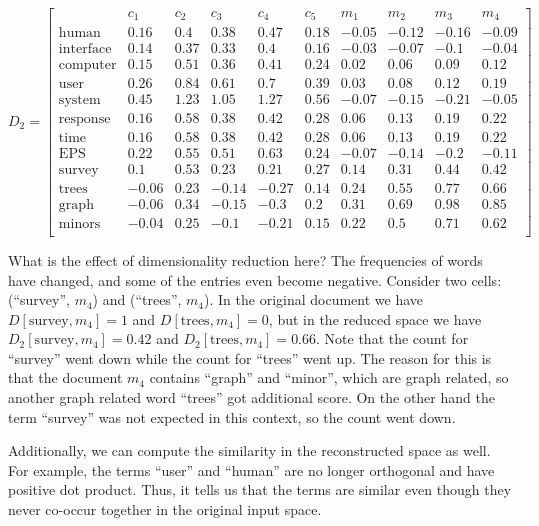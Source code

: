 $$D_2 =
\left[\begin{array}{c|ccccccccc}
 & c_1 & c_2 & c_3 & c_4 & c_5 & m_1 & m_2 & m_3 & m_4 \\
\hline
\text{human} & 0.16 & 0.4 & 0.38 & 0.47 & 0.18 & -0.05 & -0.12 & -0.16 & -0.09 \\
\text{interface} & 0.14 & 0.37 & 0.33 & 0.4 & 0.16 & -0.03 & -0.07 & -0.1 & -0.04 \\
\text{computer} & 0.15 & 0.51 & 0.36 & 0.41 & 0.24 & 0.02 & 0.06 & 0.09 & 0.12 \\
\text{user} & 0.26 & 0.84 & 0.61 & 0.7 & 0.39 & 0.03 & 0.08 & 0.12 & 0.19 \\
\text{system} & 0.45 & 1.23 & 1.05 & 1.27 & 0.56 & -0.07 & -0.15 & -0.21 & -0.05 \\
\text{response} & 0.16 & 0.58 & 0.38 & 0.42 & 0.28 & 0.06 & 0.13 & 0.19 & 0.22 \\
\text{time} & 0.16 & 0.58 & 0.38 & 0.42 & 0.28 & 0.06 & 0.13 & 0.19 & 0.22 \\
\text{EPS} & 0.22 & 0.55 & 0.51 & 0.63 & 0.24 & -0.07 & -0.14 & -0.2 & -0.11 \\
\text{survey} & 0.1 & 0.53 & 0.23 & 0.21 & 0.27 & 0.14 & 0.31 & 0.44 & 0.42 \\
\text{trees} &-0.06 & 0.23 & -0.14 & -0.27 & 0.14 & 0.24 & 0.55 & 0.77 & 0.66 \\
\text{graph} &-0.06 & 0.34 & -0.15 & -0.3 & 0.2 & 0.31 & 0.69 & 0.98 & 0.85 \\
\text{minors} &-0.04 & 0.25 & -0.1 & -0.21 & 0.15 & 0.22 & 0.5 & 0.71 & 0.62 \\
\end{array}\right]$$


What is the effect of dimensionality reduction here? The frequencies of
words have changed, and some of the entries even become negative. 
Consider two cells: (``survey'', $m_4$) and (``trees'', $m_4$). 
In the original document we have 
$D[\text{survey}, m_4] = 1$ and $D[\text{trees}, m_4] = 0$, but in the reduced space we have 
$D_2 [\text{survey}, m_4] = 0.42$ and $D_2[\text{trees}, m_4] = 0.66$.
Note that the count for ``survey'' went down while the count for 
``trees'' went up. The reason for this is that the document $m_4$
contains ``graph'' and ``minor'', which are graph related, 
so another graph related word ``trees'' got additional score. 
On the other hand the term ``survey'' was not expected in this 
context, so the count went down. 

Additionally, we can compute the similarity in the reconstructed 
space as well. For example, the terms ``user'' and ``human'' are 
no longer orthogonal and have positive dot product. Thus, it tells
us that the terms are similar even though they never co-occur 
together in the original input space. 


